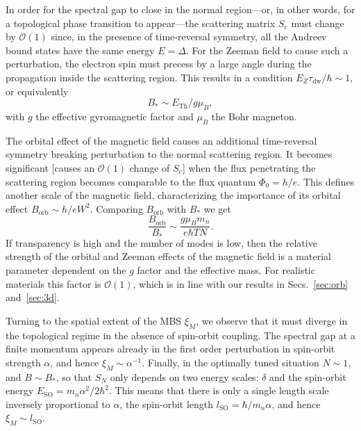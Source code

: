 \documentclass[twocolumn, notitlepage, 10pt, aps, floatfix, showpacs, prb, citeautoscript]{revtex4-1}
\newcommand{\comment}[1]{}
\begin{document}
\comment{Thouless energy sets the energy scale for $E_Z$}
In order for the spectral gap to close in the normal region---or, in other words, for a topological phase transition to appear---the scattering matrix $S_e$ must change by $\mathcal{O}(1)$ since, in the presence of time-reversal symmetry, all the Andreev bound states have the same energy $E=\Delta$.
For the Zeeman field to cause such a perturbation, the electron spin must precess by a large angle during the propagation inside the scattering region.
This results in a condition $E_Z \tau_\textrm{dw}/\hbar\sim 1$, or equivalently
\begin{equation}
B_* \sim E_\textrm{Th}/g \mu_B,\label{eq:b_critical}
\end{equation}
with $g$ the effective gyromagnetic factor and $\mu_B$ the Bohr magneton.

\comment{Orbital field has the same scaling with the geometric parameters of the device}
The orbital effect of the magnetic field causes an additional time-reversal symmetry breaking perturbation to the normal scattering region.
It becomes significant [causes an $\mathcal{O}(1)$ change of $S_e$] when the flux penetrating the scattering region becomes comparable to the flux quantum $\Phi_0=h/e$.
This defines another scale of the magnetic field, characterizing the importance of its orbital effect $B_\textrm{orb}\sim h/eW^2$.
Comparing $B_\textrm{orb}$ with $B_*$ we get
\begin{equation}
\label{eq:relative_field_strength}
\frac{B_\textrm{orb}}{B_*} \sim \frac{g\mu_Bm_n}{e\hbar TN}.
\end{equation}
If transparency is high and the number of modes is low, then the relative strength of the orbital and Zeeman effects of the magnetic field is a material parameter dependent on the $g$ factor and the effective mass.
For realistic materials this factor is $\mathcal{O}(1)$, which is in line with our results in Secs.~\ref{sec:orb} and~\ref{sec:3d}.

\comment{MBS size is given by $l_\textrm{SO}$.}
Turning to the spatial extent of the MBS $\xi_M$, we observe that it must diverge in the topological regime in the absence of spin-orbit coupling.
The spectral gap at a finite momentum appears already in the first order perturbation in spin-orbit strength $\alpha$, and hence $\xi_M \sim \alpha^{-1}$.
Finally, in the optimally tuned situation $N\sim 1$, and $B \sim B_*$, so that $S_N$ only depends on two energy scales: $\delta$ and the spin-orbit energy $E_\textrm{SO} = m_n \alpha^2/2\hbar^2$.
This means that there is only a single length scale inversely proportional to $\alpha$, the spin-orbit length $l_\textrm{SO} = \hbar/m_n\alpha$, and hence $\xi_M\sim l_\textrm{SO}$.
\end{document}
